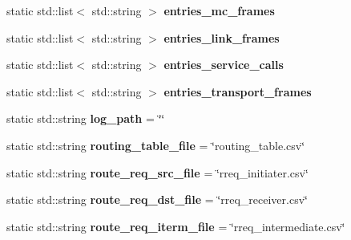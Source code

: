 \begin{DoxyCompactItemize}
\item 
\hypertarget{classLogging_a40b33b75be59b07e8bb9ab5d9684e651}{static std\-::list$<$ std\-::string $>$ {\bfseries entries\-\_\-mc\-\_\-frames}}\label{classLogging_a40b33b75be59b07e8bb9ab5d9684e651}

\item 
\hypertarget{classLogging_a65e150a78c87bdc0622da8f8647cc9ab}{static std\-::list$<$ std\-::string $>$ {\bfseries entries\-\_\-link\-\_\-frames}}\label{classLogging_a65e150a78c87bdc0622da8f8647cc9ab}

\item 
\hypertarget{classLogging_a5e73ca17e77b2468a49ab2743ee075fa}{static std\-::list$<$ std\-::string $>$ {\bfseries entries\-\_\-service\-\_\-calls}}\label{classLogging_a5e73ca17e77b2468a49ab2743ee075fa}

\item 
\hypertarget{classLogging_ad13e4a661cfc7c92273b42a1123e085e}{static std\-::list$<$ std\-::string $>$ {\bfseries entries\-\_\-transport\-\_\-frames}}\label{classLogging_ad13e4a661cfc7c92273b42a1123e085e}

\item 
\hypertarget{classLogging_a95e03e58a66ef793c8adc5a065648ecc}{static std\-::string {\bfseries log\-\_\-path} = \char`\"{}\char`\"{}}\label{classLogging_a95e03e58a66ef793c8adc5a065648ecc}

\item 
\hypertarget{classLogging_a69425aca393177dc880ea61fe6d24462}{static std\-::string {\bfseries routing\-\_\-table\-\_\-file} = \char`\"{}routing\-\_\-table.\-csv\char`\"{}}\label{classLogging_a69425aca393177dc880ea61fe6d24462}

\item 
\hypertarget{classLogging_a51adcb07ad55cafc50765770190f6acf}{static std\-::string {\bfseries route\-\_\-req\-\_\-src\-\_\-file} = \char`\"{}rreq\-\_\-initiater.\-csv\char`\"{}}\label{classLogging_a51adcb07ad55cafc50765770190f6acf}

\item 
\hypertarget{classLogging_a438f2fecc7a2e8433b2c13b7a08f8dd8}{static std\-::string {\bfseries route\-\_\-req\-\_\-dst\-\_\-file} = \char`\"{}rreq\-\_\-receiver.\-csv\char`\"{}}\label{classLogging_a438f2fecc7a2e8433b2c13b7a08f8dd8}

\item 
\hypertarget{classLogging_a5939f060848fa2e67570b9d7591be9df}{static std\-::string {\bfseries route\-\_\-req\-\_\-iterm\-\_\-file} = \char`\"{}rreq\-\_\-intermediate.\-csv\char`\"{}}\label{classLogging_a5939f060848fa2e67570b9d7591be9df}


\end{DoxyCompactItemize}
